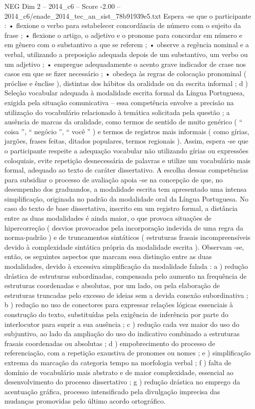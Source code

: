 \begin{textsample}{NEG Dim 2 – 2014\_c6 – Score -2.00 – 2014\_c6/enade\_2014\_tec\_an\_sist\_78b91939e5.txt}
Espera -se que o participante : • flexione o verbo para estabelecer concordância de número com o sujeito da frase ; • flexione o artigo, o adjetivo e o pronome para concordar em número e em gênero com o substantivo a que se referem ; • observe a regência nominal e a verbal, utilizando a preposição adequada depois de um substantivo, um verbo ou um adjetivo ; • empregue adequadamente o acento grave indicador de crase nos casos em que se fizer necessário ; • obedeça às regras de colocação pronominal ( próclise e ênclise ), distintas dos hábitos da oralidade ou da escrita informal ; d ) Seleção vocabular adequada à modalidade escrita formal da Língua Portuguesa, exigida pela situação comunicativa – essa competência envolve a precisão na utilização do vocabulário relacionado à temática solicitada pela questão ; a ausência de marcas da oralidade, como termos de sentido de muito genérico ( “ coisa ”, “ negócio ”, “ você ” ) e termos de registros mais informais ( como gírias, jargões, frases feitas, ditados populares, termos regionais ).
Assim, espera -se que o participante respeite a adequação vocabular não utilizando gírias ou expressões coloquiais, evite repetição desnecessária de palavras e utilize um vocabulário mais formal, adequado ao texto de caráter dissertativo.
A escolha dessas competências para subsidiar o processo de avaliação apoia -se na concepção de que, no desempenho dos graduandos, a modalidade escrita tem apresentado uma intensa simplificação, originada no padrão da modalidade oral da Língua Portuguesa.
No caso do texto de base dissertativa, inscrito em um registro formal, a distância entre as duas modalidades é ainda maior, o que provoca situações de hipercorreção ( desvios provocados pela incorporação indevida de uma regra da norma-padrão ) e de truncamentos sintáticos ( estruturas frasais incompreensíveis devido à complexidade sintática própria da modalidade escrita ).
Observam -se, então, os seguintes aspectos que marcam essa distinção entre as duas modalidades, devido à excessiva simplificação da modalidade falada : a ) redução drástica de estruturas subordinadas, compensada pelo aumento na frequência de estruturas coordenadas e absolutas, por um lado, ou pela elaboração de estruturas truncadas pelo excesso de ideias sem a devida conexão subordinativa ; b ) redução no uso de conectores para expressar relações lógicas essenciais à construção do texto, substituídas pela exigência de inferência por parte do interlocutor para suprir a sua ausência ; c ) redução cada vez maior do uso do subjuntivo, ao lado da ampliação do uso do indicativo combinado a estruturas frasais coordenadas ou absolutas ; d ) empobrecimento do processo de referenciação, com a repetição exaustiva de pronomes ou nomes ; e ) simplificação extrema da marcação da categoria tempo na morfologia verbal ; f ) falta de domínio de vocabulário mais abstrato e de maior complexidade, essencial ao desenvolvimento do processo dissertativo ; g ) redução drástica no emprego da acentuação gráfica, processo intensificado pela divulgação imprecisa das mudanças promovidas pelo último acordo ortográfico.

\end{textsample}

